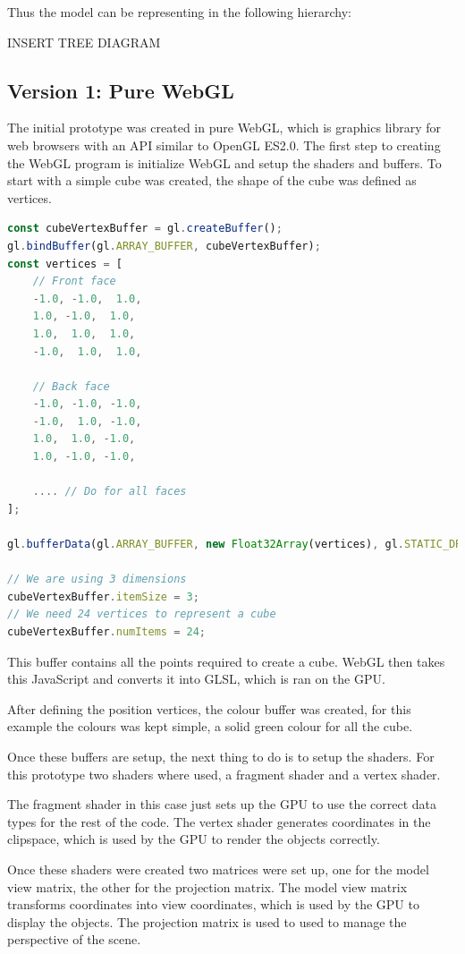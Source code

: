 \documentclass[]{article}
\begin{document}
Thus the model can be representing in the following hierarchy:

INSERT TREE DIAGRAM

\subsection{Version 1: Pure WebGL}

The initial prototype was created in pure WebGL, which is graphics library for web browsers with an API similar to OpenGL ES2.0.
The first step to creating the WebGL program is initialize WebGL and setup the shaders and buffers.
To start with a simple cube was created, the shape of the cube was defined as vertices.

\begin{lstlisting}[language=JavaScript]
const cubeVertexBuffer = gl.createBuffer();
gl.bindBuffer(gl.ARRAY_BUFFER, cubeVertexBuffer);
const vertices = [
    // Front face
    -1.0, -1.0,  1.0,
    1.0, -1.0,  1.0,
    1.0,  1.0,  1.0,
    -1.0,  1.0,  1.0,

    // Back face
    -1.0, -1.0, -1.0,
    -1.0,  1.0, -1.0,
    1.0,  1.0, -1.0,
    1.0, -1.0, -1.0,

    .... // Do for all faces
];

gl.bufferData(gl.ARRAY_BUFFER, new Float32Array(vertices), gl.STATIC_DRAW);

// We are using 3 dimensions
cubeVertexBuffer.itemSize = 3;
// We need 24 vertices to represent a cube
cubeVertexBuffer.numItems = 24;
\end{lstlisting}

This buffer contains all the points required to create a cube.
WebGL then takes this JavaScript and converts it into GLSL, which is ran on the GPU.

After defining the position vertices, the colour buffer was created, for this example
the colours was kept simple, a solid green colour for all the cube.

Once these buffers are setup, the next thing to do is to setup the shaders.
For this prototype two shaders where used, a fragment shader and a vertex shader.

The fragment shader in this case just sets up the GPU to use the correct data types for the rest of the code.
The vertex shader generates coordinates in the clipspace, which is used by the GPU to render the objects correctly.

Once these shaders were created two matrices were set up, one for the model view matrix, the other for the projection matrix.
The model view matrix transforms coordinates into view coordinates, which is used by the GPU to display the objects.
The projection matrix is used to used to manage the perspective of the scene.
\end{document}
